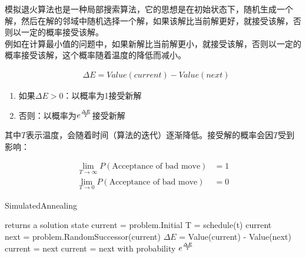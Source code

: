 模拟退火算法也是一种局部搜索算法，它的思想是在初始状态下，随机生成一个解，然后在解的邻域中随机选择一个解，如果该解比当前解更好，就接受该解，否则以一定的概率接受该解。\\

例如在计算最小值的问题中，如果新解比当前解更小，就接受该解，否则以一定的概率接受该解，这个概率随着温度的降低而减小。

\vspace{-1cm}

\begin{align*}
     & \Delta E = Value(current) - Value(next)
\end{align*}

\begin{enumerate}
    \item 如果$ \Delta E > 0 $：以概率为1接受新解
    \item 否则：以概率为$ e^{\Delta E \over T} $接受新解
\end{enumerate}

其中$ T $表示温度，会随着时间（算法的迭代）逐渐降低。接受解的概率会因$ T $受到影响：

\vspace{-1cm}

\begin{align*}
    \lim_{T \rightarrow \infty} P(\text{Acceptance of bad move}) & = 1 \\
    \lim_{T \rightarrow 0} P(\text{Acceptance of bad move})      & = 0
\end{align*}

\begin{algorithm}[H]
    \caption{SimulatedAnnealing}
    \begin{algorithmic}[1]
         returns a solution state
        \State current = problem.Initial
        \State T = schedule(t)
        \State \Return current
        \EndIf
        \\
        \State next = problem.RandomSuccessor(current)
        \State $ \Delta E $ = Value(current) - Value(next)
        \State current = next
        \Else
        \State current = next with probability $ e^{\Delta E \over T} $
        \EndIf
        \EndFor
        \EndProcedure
    \end{algorithmic}
\end{algorithm}

\newpage